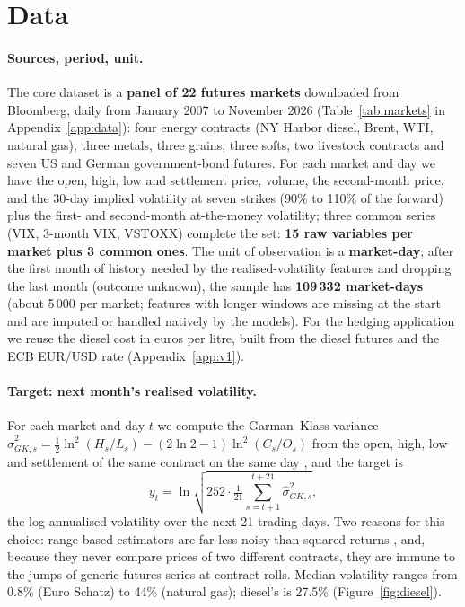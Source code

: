 \section{Data}\label{sec:data}

\paragraph{Sources, period, unit.} The core dataset is a \textbf{panel of 22 futures markets} downloaded
from Bloomberg, daily from January 2007 to November 2026 (Table~\ref{tab:markets} in
Appendix~\ref{app:data}): four energy contracts (NY Harbor diesel, Brent, WTI, natural gas), three metals,
three grains, three softs, two livestock contracts and seven US and German government-bond futures. For each
market and day we have the open, high, low and settlement price, volume, the second-month price, and the
30-day implied volatility at seven strikes (90\% to 110\% of the forward) plus the first- and second-month
at-the-money volatility; three common series (VIX, 3-month VIX, VSTOXX) complete the set: \textbf{15 raw
variables per market plus 3 common ones}. The unit of observation is a \textbf{market-day}; after the
first month of history needed by the realised-volatility features and dropping the last month (outcome
unknown), the sample has \textbf{109\,332 market-days} (about 5\,000 per market; features with longer
windows are missing at the start and are imputed or handled natively by the models). For the hedging application we reuse the diesel
cost in euros per litre, built from the diesel futures and the ECB EUR/USD rate (Appendix~\ref{app:v1}).

\paragraph{Target: next month's realised volatility.} For each market and day $t$ we compute the
Garman--Klass variance $\hat\sigma^2_{GK,s}=\tfrac12\ln^2(H_s/L_s)-(2\ln2-1)\ln^2(C_s/O_s)$ from the open,
high, low and settlement of the same contract on the same day \citep{garman1980}, and the target is
\[ y_t=\ln\sqrt{252\cdot\tfrac{1}{21}\textstyle\sum_{s=t+1}^{t+21}\hat\sigma^2_{GK,s}} ,\]
the log annualised volatility over the next 21 trading days. Two reasons for this choice: range-based
estimators are far less noisy than squared returns \citep{alizadeh2002}, and, because they never compare
prices of two different contracts, they are immune to the jumps of generic futures series at contract rolls.
Median volatility ranges from 0.8\% (Euro Schatz) to 44\% (natural gas); diesel's is 27.5\%
(Figure~\ref{fig:diesel}).

